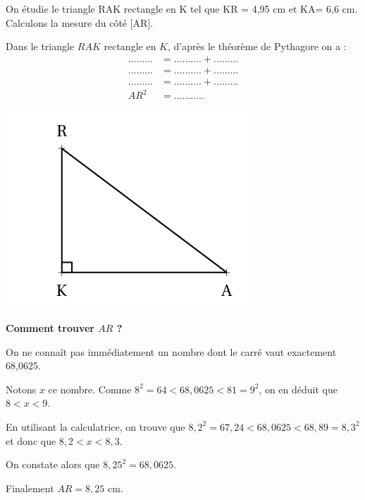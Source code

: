 \begin{examplebox}
On étudie le triangle RAK rectangle en K tel que KR = 4,95 cm et KA= 6,6 cm. Calculons la mesure du côté [AR].

\noindent
\begin{minipage}[c]{0.60\textwidth}
Dans le triangle $RAK$ rectangle en $K$, d'après le théorème de Pythagore on a :
\begin{align*}
.........  &= .......... + .........\\
.........  &= .......... + ......... \\
.........  &= .......... + ......... \\
AR^2 &= ...........
\end{align*}
\end{minipage}
\hfill
\begin{minipage}[c]{0.35\textwidth}
	\centering
	\includegraphics[width=\textwidth]{../../assets/images/4e/seq_02_pythagore/triangle_RKA_rectangle_en_K}
\end{minipage}

\vspace{1em}

\begin{minipage}[t]{\textwidth}
\textbf{Comment trouver $AR$ ?}

On ne connaît pas immédiatement un nombre dont le carré vaut exactement 68,0625.

Notons $x$ ce nombre. Comme $8^2 = 64 < 68,0625 < 81 = 9^2$, on en déduit que $8 < x < 9$.

En utilisant la calculatrice, on trouve que $8,2^2 = 67,24 < 68,0625 < 68,89 = 8,3^2$ et donc que $8,2 < x < 8,3$.

On constate alors que $8,25^2 = 68,0625$.

Finalement $AR = 8,25$ cm.
\end{minipage}
\end{examplebox}

